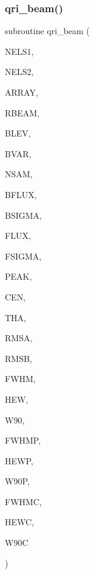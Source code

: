 \subsubsection{\texorpdfstring{qri\+\_\+beam()}{qri\_beam()}}
{\footnotesize\ttfamily subroutine qri\+\_\+beam (\begin{DoxyParamCaption}\item[{integer}]{N\+E\+L\+S1,  }\item[{integer}]{N\+E\+L\+S2,  }\item[{double precision, dimension(nels1,nels2)}]{A\+R\+R\+AY,  }\item[{double precision}]{R\+B\+E\+AM,  }\item[{double precision}]{B\+L\+EV,  }\item[{double precision}]{B\+V\+AR,  }\item[{integer}]{N\+S\+AM,  }\item[{double precision}]{B\+F\+L\+UX,  }\item[{double precision}]{B\+S\+I\+G\+MA,  }\item[{double precision}]{F\+L\+UX,  }\item[{double precision}]{F\+S\+I\+G\+MA,  }\item[{double precision, dimension(2)}]{P\+E\+AK,  }\item[{double precision, dimension(2)}]{C\+EN,  }\item[{double precision}]{T\+HA,  }\item[{double precision}]{R\+M\+SA,  }\item[{double precision}]{R\+M\+SB,  }\item[{double precision}]{F\+W\+HM,  }\item[{double precision}]{H\+EW,  }\item[{double precision}]{W90,  }\item[{double precision}]{F\+W\+H\+MP,  }\item[{double precision}]{H\+E\+WP,  }\item[{double precision}]{W90P,  }\item[{double precision}]{F\+W\+H\+MC,  }\item[{double precision}]{H\+E\+WC,  }\item[{double precision}]{W90C }\end{DoxyParamCaption})}

\mbox{\label{qri__beam_8f_a130df173495bc9b58bd77fcdb6393924}} 
